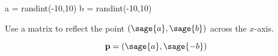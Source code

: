 \documentclass{ximera}
\author{Jenny Sheldon \and Bart Snapp}
\begin{document}
\makerandom
 
\begin{sagesilent}
  a = randint(-10,10)
  b = randint(-10,10)
\end{sagesilent}

\begin{exercise}
  Use a matrix to reflect the point $(\sage{a},\sage{b})$ across the
  $x$-axis.
  \begin{prompt}
    \[
    \vec{p} = (\sage{a},\sage{-b})
    \]
  \end{prompt}
\end{exercise}
\end{document}
